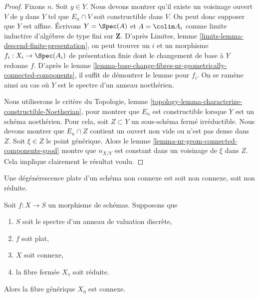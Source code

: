 \begin{proof}
Fixons $n$. Soit $y \in Y$. Nous devons montrer qu'il existe un voisinage ouvert
$V$ de $y$ dans $Y$ tel que $E_n \cap V$ soit constructible dans $V$. On peut donc
supposer que $Y$ est affine. Écrivons $Y = \Spec(A)$ et
$A = \colim A_i$ comme limite inductive d'algèbres
de type fini sur $\mathbf{Z}$. D'après
Limites, lemme \ref{limits-lemma-descend-finite-presentation},
on peut trouver un $i$ et un morphisme $f_i : X_i \to \Spec(A_i)$ de
présentation finie dont le changement de base à $Y$ redonne $f$. D'après le
lemme \ref{lemma-base-change-fibres-nr-geometrically-connected-components},
il suffit de démontrer le lemme pour $f_i$. On se ramène ainsi au
cas où $Y$ est le spectre d'un anneau noethérien.

\medskip\noindent
Nous utiliserons le critère du
Topologie, lemme \ref{topology-lemma-characterize-constructible-Noetherian},
pour montrer que $E_n$ est constructible lorsque $Y$ est un schéma noethérien.
Pour cela, soit $Z \subset Y$ un sous-schéma fermé irréductible.
Nous devons montrer que $E_n \cap Z$ contient un ouvert non vide
ou n'est pas dense dans $Z$. Soit $\xi \in Z$ le point générique. Alors le
lemme \ref{lemma-nr-geom-connected-components-good}
montre que $n_{X/Y}$ est constant dans un voisinage de $\xi$ dans $Z$.
Cela implique clairement le résultat voulu.
\end{proof}

\begin{lemma}
\label{lemma-connected-flat-over-dvr}
\begin{slogan}
Une dégénérescence plate d'un schéma non connexe est soit non connexe,
soit non réduite.
\end{slogan}
Soit $f : X \to S$ un morphisme de schémas.
Supposons que
\begin{enumerate}
\item $S$ soit le spectre d'un anneau de valuation discrète,
\item $f$ soit plat,
\item $X$ soit connexe,
\item la fibre fermée $X_s$ soit réduite.
\end{enumerate}
Alors la fibre générique $X_\eta$ est connexe.
\end{lemma}

